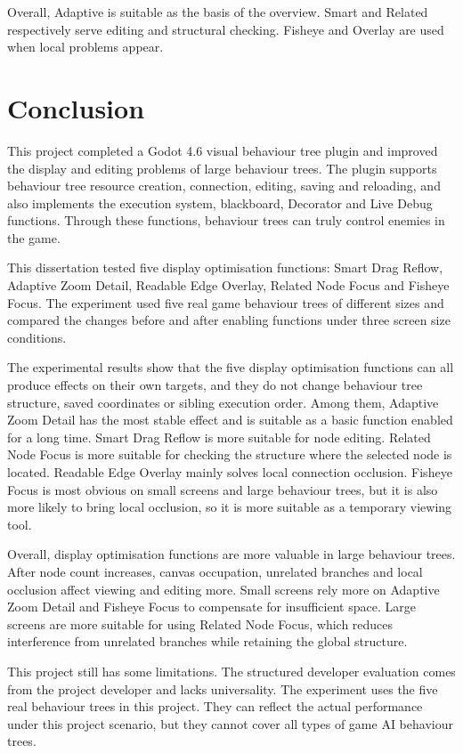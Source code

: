 \documentclass[11pt,a4paper,oneside,extrafontsizes]{memoir}
\begin{document}
Overall, Adaptive is suitable as the basis of the overview. Smart and Related respectively serve editing and structural checking. Fisheye and Overlay are used when local problems appear.

\chapter{Conclusion}

This project completed a Godot 4.6 visual behaviour tree plugin and improved the display and editing problems of large behaviour trees. The plugin supports behaviour tree resource creation, connection, editing, saving and reloading, and also implements the execution system, blackboard, Decorator and Live Debug functions. Through these functions, behaviour trees can truly control enemies in the game.

This dissertation tested five display optimisation functions: Smart Drag Reflow, Adaptive Zoom Detail, Readable Edge Overlay, Related Node Focus and Fisheye Focus. The experiment used five real game behaviour trees of different sizes and compared the changes before and after enabling functions under three screen size conditions.

The experimental results show that the five display optimisation functions can all produce effects on their own targets, and they do not change behaviour tree structure, saved coordinates or sibling execution order. Among them, Adaptive Zoom Detail has the most stable effect and is suitable as a basic function enabled for a long time. Smart Drag Reflow is more suitable for node editing. Related Node Focus is more suitable for checking the structure where the selected node is located. Readable Edge Overlay mainly solves local connection occlusion. Fisheye Focus is most obvious on small screens and large behaviour trees, but it is also more likely to bring local occlusion, so it is more suitable as a temporary viewing tool.

Overall, display optimisation functions are more valuable in large behaviour trees. After node count increases, canvas occupation, unrelated branches and local occlusion affect viewing and editing more. Small screens rely more on Adaptive Zoom Detail and Fisheye Focus to compensate for insufficient space. Large screens are more suitable for using Related Node Focus, which reduces interference from unrelated branches while retaining the global structure.

This project still has some limitations. The structured developer evaluation comes from the project developer and lacks universality. The experiment uses the five real behaviour trees in this project. They can reflect the actual performance under this project scenario, but they cannot cover all types of game AI behaviour trees.
\end{document}
